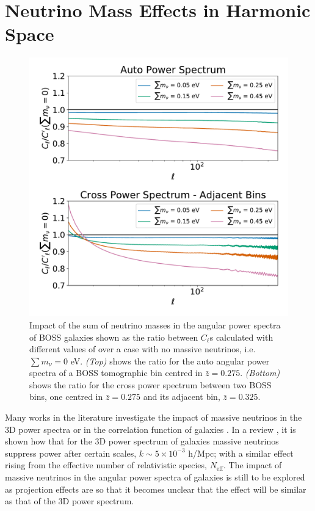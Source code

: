 \section{Neutrino Mass Effects in Harmonic Space}
\begin{figure}
\begin{center}
\includegraphics[scale=0.50]{Neutrino-FIGS/Neutrinos_SumMnu.pdf}
\caption[Impact of the sum of neutrino masses in the angular power spectra of galaxies.]{Impact of the sum of neutrino masses in the angular power spectra of BOSS galaxies shown as the ratio between $C_{\ell}$s calculated with different values of \NM{} over a case with no massive neutrinos, i.e. $\sum m_{\nu} = 0$ eV. \textit{(Top)} shows the ratio for the auto angular power spectra of a BOSS tomographic bin centred in $\bar{z} = 0.275$. \textit{(Bottom)} shows the ratio for the cross power spectrum between two BOSS bins, one centred in $\bar{z} = 0.275$ and its adjacent bin, $\bar{z} = 0.325$.}
\label{fig:neutrinoCompareSumM}
\end{center}
\end{figure}
Many works in the literature investigate the impact of massive neutrinos in the 3D power spectra or in the correlation function of galaxies \citep{2007FBA,2012Julien-Deg,Bird2012}. In a review \cite{2006NeutrinoReview}, it is shown how that for the 3D power spectrum of galaxies massive neutrinos suppress power after certain scales, $k \sim 5\times 10^{-3}$ h/Mpc; with a similar effect rising from the effective number of relativistic species, $N_{\text{eff}}$. The impact of massive neutrinos in the angular power spectra of galaxies is still to be explored as projection effects are so that it becomes unclear that the effect will be similar as that of the 3D power spectrum.

